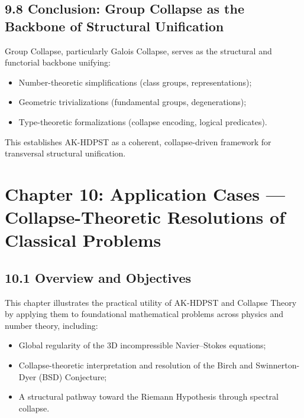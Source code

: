 \documentclass[11pt]{article}
\begin{document}
\subsection*{9.8 Conclusion: Group Collapse as the Backbone of Structural Unification}

Group Collapse, particularly Galois Collapse, serves as the structural and functorial backbone unifying:

\begin{itemize}
    \item Number-theoretic simplifications (class groups, representations);
    \item Geometric trivializations (fundamental groups, degenerations);
    \item Type-theoretic formalizations (collapse encoding, logical predicates).
\end{itemize}

This establishes AK-HDPST as a coherent, collapse-driven framework for transversal structural unification.



\section{Chapter 10: Application Cases — Collapse-Theoretic Resolutions of Classical Problems}

\subsection*{10.1 Overview and Objectives}

This chapter illustrates the practical utility of AK-HDPST and Collapse Theory by applying them to foundational mathematical problems across physics and number theory, including:

\begin{itemize}
    \item Global regularity of the 3D incompressible Navier–Stokes equations;
    \item Collapse-theoretic interpretation and resolution of the Birch and Swinnerton-Dyer (BSD) Conjecture;
    \item A structural pathway toward the Riemann Hypothesis through spectral collapse.
\end{itemize}
\end{document}
